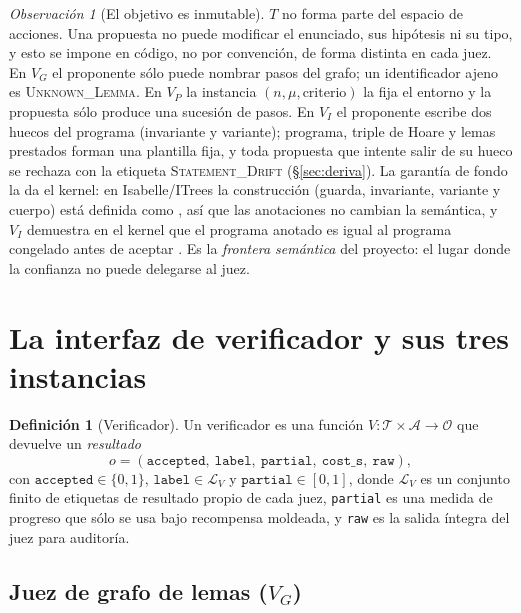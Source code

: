 \documentclass[11pt,a4paper]{article}
\theoremstyle{definition}
\newtheorem{definition}{Definición}
\theoremstyle{remark}
\newtheorem{remark}{Observación}
\newcommand{\lab}[1]{\textsc{#1}}
\newcommand{\VG}{\texorpdfstring{$V_G$}{V\_G}}
\newcommand{\id}[1]{\texttt{\detokenize{#1}}}
\begin{document}
\begin{remark}[El objetivo es inmutable]\label{obs:inmutable}
$T$ no forma parte del espacio de acciones. Una propuesta no puede modificar el enunciado, sus hipótesis ni su tipo, y esto se impone en código, no por convención, de forma distinta en cada juez. En $V_G$ el proponente sólo puede nombrar pasos del grafo; un identificador ajeno es \lab{Unknown\_Lemma}. En $V_P$ la instancia $(n,\mu,\text{criterio})$ la fija el entorno y la propuesta sólo produce una sucesión de pasos. En $V_I$ el proponente escribe dos huecos del programa (invariante y variante); programa, triple de Hoare y lemas prestados forman una plantilla fija, y toda propuesta que intente salir de su hueco se rechaza con la etiqueta \lab{Statement\_Drift} (§\ref{sec:deriva}). La garantía de fondo la da el kernel: en Isabelle/ITrees la construcción \id{while_inv_var B I V P} (guarda, invariante, variante y cuerpo) está definida como \id{iterate B P}, así que las anotaciones no cambian la semántica, y $V_I$ demuestra en el kernel que el programa anotado es igual al programa congelado antes de aceptar \EnCurso. Es la \emph{frontera semántica} del proyecto: el lugar donde la confianza no puede delegarse al juez.
\end{remark}

\section{La interfaz de verificador y sus tres instancias}\label{sec:jueces}

\begin{definition}[Verificador]
Un verificador es una función $V : \mathcal{T} \times \mathcal{A} \to \mathcal{O}$ que devuelve un \emph{resultado}
\[
  o = (\texttt{accepted},\ \texttt{label},\ \texttt{partial},\ \texttt{cost\_s},\ \texttt{raw}),
\]
con $\texttt{accepted}\in\{0,1\}$, $\texttt{label}\in \mathcal{L}_V$ y $\texttt{partial}\in[0,1]$,
donde $\mathcal{L}_V$ es un conjunto finito de etiquetas de resultado propio de cada juez, \texttt{partial} es una medida de progreso que sólo se usa bajo recompensa moldeada, y \texttt{raw} es la salida íntegra del juez para auditoría.
\end{definition}

\subsection{Juez de grafo de lemas (\VG)}\label{sec:VG}
\end{document}
